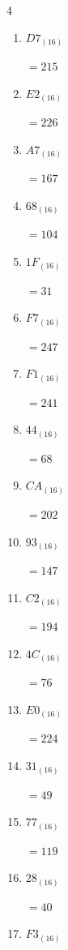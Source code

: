 \begin{multicols}{4}
\begin{enumerate}
  \item $D7_{(16)}$

        $=215$

  \item $E2_{(16)}$

        $=226$

  \item $A7_{(16)}$

        $=167$

  \item $68_{(16)}$

        $=104$

  \item $1F_{(16)}$

        $=31$

\columnbreak %

  \item $F7_{(16)}$

        $=247$

  \item $F1_{(16)}$

        $=241$

  \item $44_{(16)}$

        $=68$

  \item $CA_{(16)}$

        $=202$

  \item $93_{(16)}$

        $=147$

  \item $C2_{(16)}$

        $=194$

  \item $4C_{(16)}$

        $=76$

  \item $E0_{(16)}$

        $=224$

  \item $31_{(16)}$

        $=49$

  \item $77_{(16)}$

        $=119$

  \item $28_{(16)}$

        $=40$

  \item $F3_{(16)}$


\end{enumerate}
\end{multicols}
